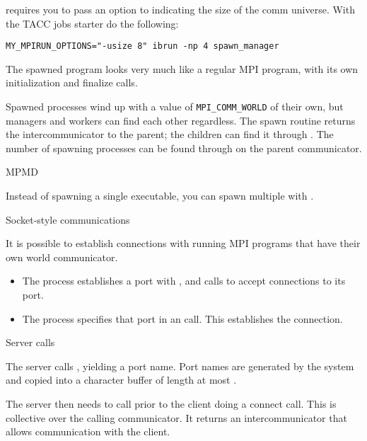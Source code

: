 \begin{taccnote}
 requires you to pass an option  to
 indicating the size of the comm universe. With the TACC
jobs starter  do the following:
\begin{verbatim}
MY_MPIRUN_OPTIONS="-usize 8" ibrun -np 4 spawn_manager
\end{verbatim}
\end{taccnote}
The spawned program looks very much like a regular MPI program, with
its own initialization and finalize calls.

%

Spawned processes wind up with a value of \lstinline$MPI_COMM_WORLD$ of their
own, but managers and workers can find each other regardless.
The spawn routine returns the intercommunicator to the parent; the children
can find it through . The number of
spawning processes can be found through
 on the parent communicator.


 {MPMD}

Instead of spawning a single executable, you can spawn multiple with
.

 {Socket-style communications}

It is possible to establish connections with running MPI programs that
have their own world communicator.
\begin{itemize}
\item The  process establishes a port with 
  , and calls  to accept
  connections to its port.
\item The  process specifies that port 
  in an  call. This establishes the connection.
\end{itemize}

 {Server calls}

The server calls , yielding a port name.
Port names are generated by the system and copied into a character
buffer of length at most .


The server then needs to call 
 prior to the client doing a connect call.
This is collective over the calling communicator. It returns an
intercommunicator that allows communication with the client.


